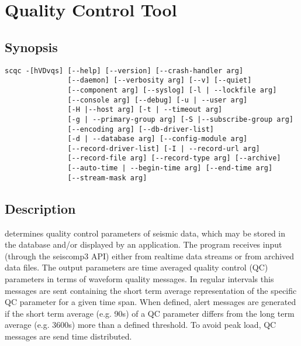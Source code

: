 \section{Quality Control Tool}

\subsection{Synopsis}
\begin{small}
\begin{verbatim}
scqc -[hVDvqs] [--help] [--version] [--crash-handler arg]
               [--daemon] [--verbosity arg] [--v] [--quiet]
               [--component arg] [--syslog] [-l | --lockfile arg]
               [--console arg] [--debug] [-u | --user arg]
               [-H |--host arg] [-t | --timeout arg]
               [-g | --primary-group arg] [-S |--subscribe-group arg]
               [--encoding arg] [--db-driver-list]
               [-d | --database arg] [--config-module arg]
               [--record-driver-list] [-I | --record-url arg]
               [--record-file arg] [--record-type arg] [--archive]
               [--auto-time | --begin-time arg] [--end-time arg]
               [--stream-mask arg]
\end{verbatim}
\end{small}

\subsection{Description}

 determines quality control parameters of seismic data, which may be stored in the database and/or displayed by an application. The program receives input (through the seiscomp3 API) either from realtime data streams or from archived data files. The output parameters are time averaged quality control (QC) parameters in terms of waveform quality messages. In regular intervals this messages are sent containing the short term average representation of the specific QC parameter for a given time span. When defined, alert messages are generated if the short term average (e.g. 90s) of a QC parameter differs from the long term average (e.g. 3600s) more than a defined threshold. To avoid peak load, QC messages are send time distributed.\\


